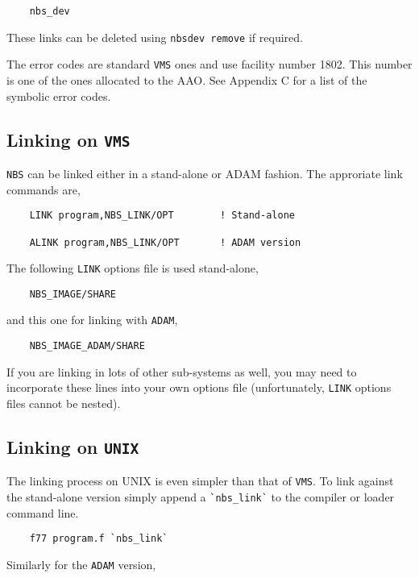 \documentclass[twoside,11pt]{article}
\renewcommand{\_}{\texttt{\symbol{95}}}
\begin{document}
\begin {verbatim}
    nbs_dev
\end{verbatim}

These links can be deleted using {\tt nbs\_dev remove} if required.

The error codes are standard {\tt VMS} ones and use facility number 1802. This
number is one of the ones allocated to the AAO. See Appendix C for a list of
the symbolic error codes.

\subsection{Linking on {\tt VMS}}

{\tt NBS} can be linked either in a stand-alone or ADAM fashion. The
approriate link commands are,

\begin {verbatim}
    LINK program,NBS_LINK/OPT        ! Stand-alone

    ALINK program,NBS_LINK/OPT       ! ADAM version
\end{verbatim}

The following {\tt LINK} options file is used stand-alone,

\begin {verbatim}
    NBS_IMAGE/SHARE
\end{verbatim}

and this one for linking with {\tt ADAM},

\begin {verbatim}
    NBS_IMAGE_ADAM/SHARE
\end{verbatim}

If you are linking in lots of other sub-systems as well, you may need to
incorporate these lines into your own options file (unfortunately, {\tt LINK}
options files cannot be nested).

\subsection{Linking on {\tt UNIX}}

The linking process on UNIX is even simpler than that of {\tt VMS}. To link
against the stand-alone version simply append a \verb+`nbs_link`+ to the
compiler or loader command line.

\begin {verbatim}
    f77 program.f `nbs_link`
\end{verbatim}

Similarly for the {\tt ADAM} version,
\end{document}
